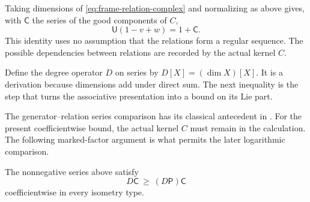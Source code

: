 Taking dimensions of \eqref{eq:frame-relation-complex} and normalizing
as above gives, with $\mathsf C$ the series of the good components of $C$,
\begin{equation}\label{eq:frame-euler}
 \mathsf U(1-v+w)=1+\mathsf C.
\end{equation}
This identity uses no assumption that the relations form a regular
sequence.  The possible dependencies between relations are recorded
by the actual kernel $C$.

Define the degree operator $D$ on series by $D[X]=(\dim X)[X]$.
It is a derivation because dimensions add under direct sum.  The next
inequality is the step that turns the associative presentation into
a bound on its Lie part.

The generator--relation series comparison has its classical antecedent
in \citet[Section~2, Lemmas~2--3]{GolodShafarevich1964}.
For the present coefficientwise bound, the actual kernel $C$ must
remain in the calculation. The following marked-factor argument is
what permits the later logarithmic comparison.

\begin{lemma}\label{lem:frame-marked-factor}
The nonnegative series above satisfy
\begin{equation}\label{eq:frame-marked-factor}
 D\mathsf C\ \geq\ (D\mathsf P)\mathsf C
\end{equation}
coefficientwise in every isometry type.
\end{lemma}


